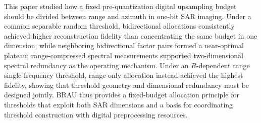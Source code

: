 \documentclass[conference]{IEEEtran}
\begin{document}
This paper studied how a fixed pre-quantization digital upsampling budget should be divided between range and azimuth in one-bit SAR imaging. Under a common separable random threshold, bidirectional allocations consistently achieved higher reconstruction fidelity than concentrating the same budget in one dimension, while neighboring bidirectional factor pairs formed a near-optimal plateau; range-compressed spectral measurements supported two-dimensional spectral redundancy as the operating mechanism. Under an $R$-dependent range single-frequency threshold, range-only allocation instead achieved the highest fidelity, showing that threshold geometry and dimensional redundancy must be designed jointly. BRAU thus provides a fixed-budget allocation principle for thresholds that exploit both SAR dimensions and a basis for coordinating threshold construction with digital preprocessing resources.
\end{document}
